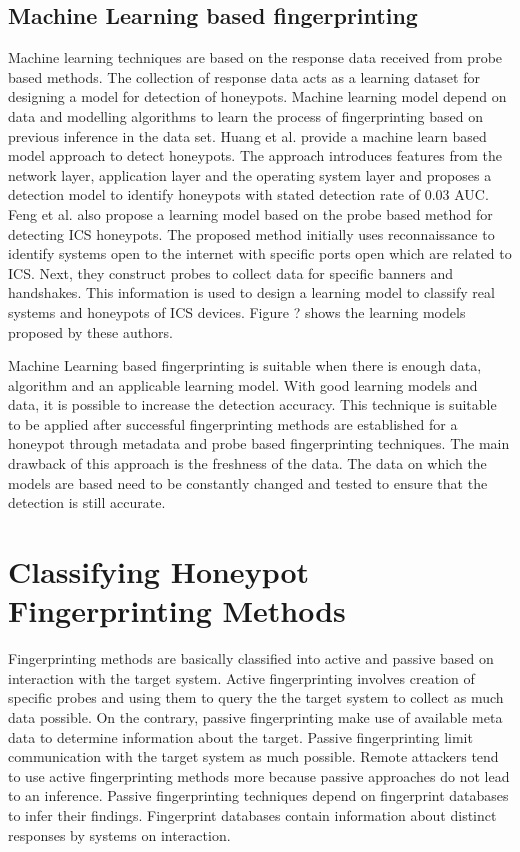\documentclass[letterpaper, 10 pt, conference]{ieeeconf}  %
\begin{document}
\subsection{Machine Learning based fingerprinting}
Machine learning techniques are based on the response data received from probe based methods. The collection of response data acts as a learning dataset for designing a model for detection of honeypots. Machine learning model depend on data and modelling algorithms to learn the process of fingerprinting based on previous inference in the data set. Huang et al. \cite{huang} provide a machine learn based model approach to detect honeypots. The approach introduces features from the network layer, application layer and the operating system layer and proposes a detection model to identify honeypots with stated detection rate of 0.03 AUC. Feng et al. \cite{Feng2016} also propose a learning model based on the probe based method for detecting ICS honeypots. The proposed method initially uses reconnaissance to identify systems open to the internet with specific ports open which are related to ICS. Next, they construct probes to collect data for specific banners and handshakes. This information is used to design a learning model to classify real systems and honeypots of ICS devices. Figure ? shows the learning models proposed by these authors. 

Machine Learning based fingerprinting is suitable when there is enough data, algorithm and an applicable learning model. With good learning models and data, it is possible to increase the detection accuracy. This technique is suitable to be applied after successful fingerprinting methods are established for a honeypot through metadata and probe based fingerprinting techniques. The main drawback of this approach is the freshness of the data. The data on which the models are based need to be constantly changed and tested to ensure that the detection is still accurate. 


 \section{Classifying Honeypot Fingerprinting Methods}
   
   Fingerprinting methods are basically classified into active and passive based on interaction with the target system. Active fingerprinting involves creation of specific probes and using them to query the the target system to collect as much data possible. On the contrary, passive fingerprinting  make use of available meta data to determine information about the target. Passive fingerprinting limit communication with the target system as much possible. Remote attackers tend to use active fingerprinting methods more because passive approaches do not lead to an inference. Passive fingerprinting techniques depend on fingerprint databases to infer their findings. Fingerprint databases contain information about distinct responses by systems on interaction.
   
\end{document}
